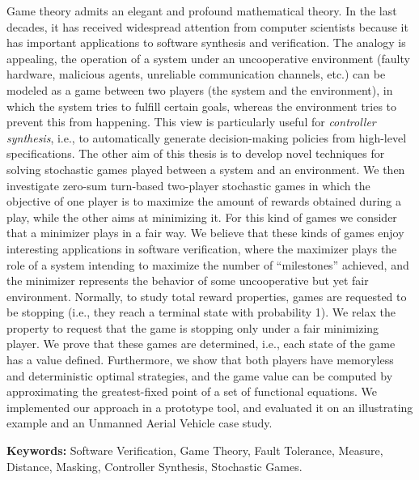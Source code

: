 Game theory \cite{MorgensternNeuman42}  admits an elegant and profound mathematical theory. 
In the last decades, it has received widespread attention from computer scientists because it has important applications to software synthesis and verification. 
The analogy is appealing, the operation of a system under an uncooperative environment (faulty hardware, malicious agents, unreliable communication channels, etc.) can be modeled as a game 
between two players (the system and the environment), in which the system tries to fulfill certain goals, whereas the environment tries to prevent this from happening. 
This view is particularly useful for \emph{controller synthesis}, i.e., to automatically generate decision-making policies from high-level specifications.
The other aim of this thesis is to develop novel techniques for solving stochastic games played between a system and an environment.
We then investigate zero-sum turn-based two-player stochastic games in which the objective of one player is to maximize the amount of rewards obtained during a play, while
the other %
aims at minimizing it. %
For this kind of games we consider that a minimizer plays in a 
fair way. We believe that these kinds of games enjoy interesting applications in software verification, where the maximizer plays the role of a system intending to maximize the
number of  ``milestones'' achieved, and the minimizer represents the behavior of some uncooperative but yet fair environment.
Normally, to study total reward properties, games are requested to be stopping (i.e., they reach a terminal state with probability 1).  %
We relax the property to request that the game is stopping only under a fair minimizing player.
We prove that these games are determined, i.e., each state of the game has a value defined. Furthermore, we show that both
players have memoryless and deterministic optimal strategies, and the game value can be computed by approximating the greatest-fixed point of a set of functional equations. We implemented our approach in a prototype tool, and evaluated it on an illustrating example and an Unmanned Aerial Vehicle case study.

\noindent
\textbf{Keywords:} Software Verification, Game Theory, Fault Tolerance, Measure, Distance, Masking, Controller Synthesis, Stochastic Games.